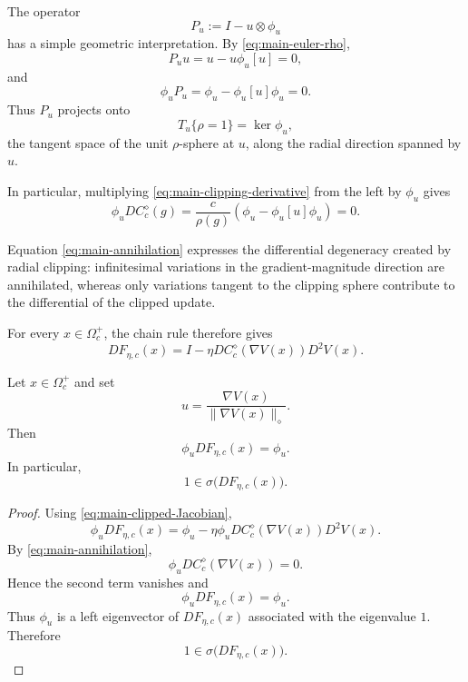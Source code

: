 The operator
\[
P_u:=I-u\otimes\phi_u
\]
has a simple geometric interpretation. By
\eqref{eq:main-euler-rho},
\[
P_u u
=
u-u\phi_u[u]
=
0,
\]
and
\[
\phi_u P_u
=
\phi_u-\phi_u[u]\phi_u
=
0.
\]
Thus $P_u$ projects onto
\[
T_u\{\rho=1\}
=
\ker\phi_u,
\]
the tangent space of the unit $\rho$-sphere at $u$, along the
radial direction spanned by $u$.

In particular, multiplying
\eqref{eq:main-clipping-derivative} from the left by $\phi_u$
gives
\begin{equation}
\phi_uDC_c^\diamond(g)
=
\frac{c}{\rho(g)}
\left(
\phi_u-\phi_u[u]\phi_u
\right)
=
0.
\label{eq:main-annihilation}
\end{equation}

Equation \eqref{eq:main-annihilation} expresses the differential
degeneracy created by radial clipping: infinitesimal variations
in the gradient-magnitude direction are annihilated, whereas only
variations tangent to the clipping sphere contribute to the
differential of the clipped update.

For every $x\in\Omega_c^+$, the chain rule therefore gives
\begin{equation}
DF_{\eta,c}(x)
=
I
-
\eta
DC_c^\diamond(\nabla V(x))
D^2V(x).
\label{eq:main-clipped-Jacobian}
\end{equation}

\begin{proposition}
\label{prop:pointwise-neutral-covector}
Let $x\in\Omega_c^+$ and set
\[
u
=
\frac{\nabla V(x)}
{\|\nabla V(x)\|_\diamond}.
\]
Then
\begin{equation}
\phi_uDF_{\eta,c}(x)=\phi_u.
\label{eq:main-pointwise-neutral}
\end{equation}
In particular,
\[
1\in\sigma\bigl(DF_{\eta,c}(x)\bigr).
\]
\end{proposition}

\begin{proof}
Using \eqref{eq:main-clipped-Jacobian},
\[
\phi_uDF_{\eta,c}(x)
=
\phi_u
-
\eta
\phi_u
DC_c^\diamond(\nabla V(x))
D^2V(x).
\]
By \eqref{eq:main-annihilation},
\[
\phi_u
DC_c^\diamond(\nabla V(x))
=
0.
\]
Hence the second term vanishes and
\[
\phi_uDF_{\eta,c}(x)=\phi_u.
\]
Thus $\phi_u$ is a left eigenvector of $DF_{\eta,c}(x)$
associated with the eigenvalue $1$. Therefore
\[
1\in\sigma\bigl(DF_{\eta,c}(x)\bigr).
\]
\end{proof}

